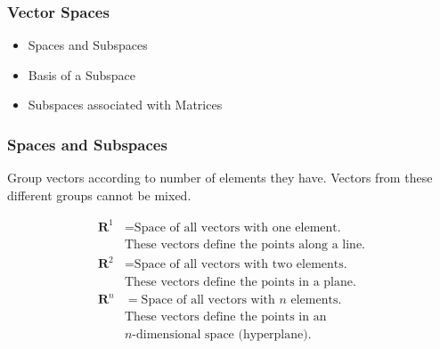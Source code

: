 \documentclass[10pt]{beamer}
\begin{document}
\begin{frame}
\frametitle{Vector Spaces}

\begin{itemize}
    \item   Spaces and Subspaces
    \item   Basis of a Subspace
    \item   Subspaces associated with Matrices
\end{itemize}

\end{frame}
\begin{frame}
\frametitle{Spaces and Subspaces}

Group vectors according to number of elements they have.
Vectors from these different groups cannot be mixed.

\begin{center}
    \renewcommand{\arraystretch}{1.3}
    \begin{align*}
        \mathbf{R}^1 & =  \text{Space of all vectors with one element.}\\
                     &    \text{These vectors define the points along a line.}\\
        \mathbf{R}^2 & =  \text{Space of all vectors with two elements.}\\
                     &    \text{These vectors define the points in a plane.} \\
        \mathbf{R}^n & =  \text{Space of all vectors with $n$ elements.}\\
                     &    \text{These vectors define the points in an}\\
                     &    \text{$n$-dimensional space (hyperplane).}\\
    \end{align*}
\end{center}

\end{frame}
\end{document}
